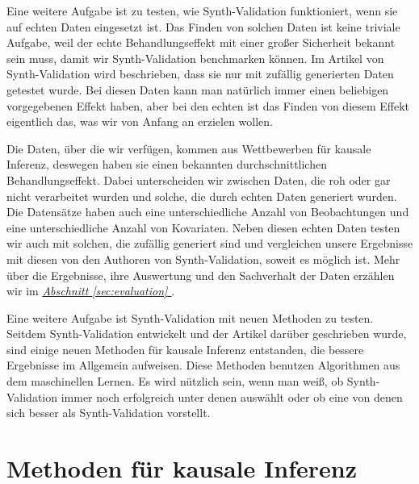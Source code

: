 \documentclass[12pt,a4paper,twoside]{scrartcl}
\numberwithin{equation}{section}
\newcommand{\refsec}[1]{\emph{\hyperref[#1]{Abschnitt \ref*{#1} }}}
\begin{document}
\noindent
Eine weitere Aufgabe ist zu testen, wie Synth-Validation funktioniert, wenn sie auf echten Daten eingesetzt ist. Das Finden von solchen Daten ist keine triviale Aufgabe, weil der echte Behandlungseffekt mit einer großer Sicherheit bekannt sein muss, damit wir Synth-Validation benchmarken können. Im Artikel von Synth-Validation wird beschrieben, dass sie nur mit zufällig generierten Daten getestet wurde. Bei diesen Daten kann man natürlich immer einen beliebigen vorgegebenen Effekt haben, aber bei den echten ist das Finden von diesem Effekt eigentlich das, was wir von Anfang an erzielen wollen.\par

\noindent
Die Daten, über die wir verfügen, kommen aus Wettbewerben für kausale Inferenz, deswegen haben sie einen bekannten durchschnittlichen Behandlungseffekt. Dabei unterscheiden wir zwischen Daten, die roh oder gar nicht verarbeitet wurden und solche, die durch echten Daten generiert wurden. Die Datensätze haben auch eine unterschiedliche Anzahl von Beobachtungen und eine unterschiedliche Anzahl von Kovariaten. Neben diesen echten Daten testen wir auch mit solchen, die zufällig generiert sind und vergleichen unsere Ergebnisse mit diesen von den Authoren von Synth-Validation, soweit es möglich ist. Mehr über die Ergebnisse, ihre Auswertung und den Sachverhalt der Daten erzählen wir im \refsec{sec:evaluation}.\par 

\noindent
Eine weitere Aufgabe ist Synth-Validation mit neuen Methoden zu testen. Seitdem Synth-Validation entwickelt und der Artikel darüber geschrieben wurde, sind einige neuen Methoden für kausale Inferenz entstanden, die bessere Ergebnisse im Allgemein aufweisen. Diese Methoden benutzen Algorithmen aus dem maschinellen Lernen. Es wird nützlich sein, wenn man weiß, ob Synth-Validation immer noch erfolgreich unter denen auswählt oder ob eine von denen sich besser als Synth-Validation vorstellt.\par

\clearpage

\section{Methoden für kausale Inferenz}\label{sec:methoden}
\end{document}
